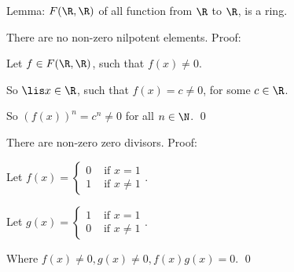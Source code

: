         \newcommand\threec{F(\R,\R)}

        Lemma: $F(\R,\R)$ of all function from $\R$ to $\R$, is a ring.

        There are no non-zero nilpotent elements. Proof:
        
        Let $f \in \threec$, such that $f(x) \neq 0$.

        So $\lis x \in \R$, such that $f(x) = c \neq 0$, for some $c \in \R$.

        So $(f(x))^n = c^n \neq 0$ for all $n \in \N$.
        \qed

        There are non-zero zero divisors. Proof:

        Let $f(x) = 
        \begin{cases}
            0 &\text{ if $x = 1$} \\
            1 &\text{ if $x \neq 1$} 
        \end{cases}$.

        Let $g(x) = 
        \begin{cases}
            1 &\text{ if $x = 1$} \\
            0 &\text{ if $x \neq 1$} 
        \end{cases}$.

        Where $f(x) \neq 0, g(x) \neq 0, f(x)g(x) = 0$.
        \qed
